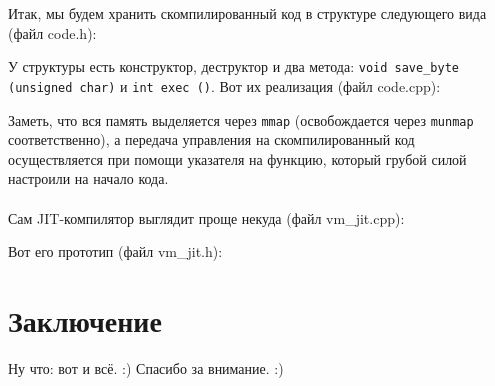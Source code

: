 \documentclass[11pt]{book}
\begin{document}
\bigskip
Итак, мы будем хранить скомпилированный код в структуре следующего вида (файл code.h):

У структуры есть конструктор, деструктор и два метода: \texttt{void save\_byte (unsigned char)} и \texttt{int exec ()}.
Вот их реализация (файл code.cpp):

Заметь, что вся память выделяется через \texttt{mmap} (освобождается через \texttt{munmap} соответственно),
а передача управления на скомпилированный код осуществляется при помощи указателя на функцию,
который грубой силой настроили на начало кода.
\\ \\
Сам JIT-компилятор выглядит проще некуда (файл vm\_jit.cpp):

Вот его прототип (файл vm\_jit.h):


\section{Заключение}
Ну что: вот и всё. :)
Спасибо за внимание. :)
\end{document}
